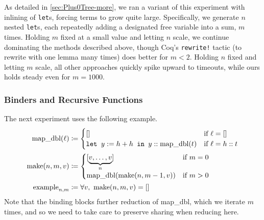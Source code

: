 As detailed in \autoref{sec:Plus0Tree-more}, we ran a variant of this experiment with inlining of \texttt{let}s, forcing terms to grow quite large.
Specifically, we generate $n$ nested \texttt{let}s, each repeatedly adding a designated free variable into a sum, $m$ times.
Holding $m$ fixed at a small value and letting $n$ scale, we continue dominating the methods described above, though Coq's \texttt{rewrite!} tactic (to rewrite with one lemma many times) does better for $m < 2$.
Holding $n$ fixed and letting $m$ scale, all other approaches quickly spike upward to timeouts, while ours holds steady even for $m = 1000$.

\subsubsection{Binders and Recursive Functions} \label{sec:micro:LiftLetsMap}

The next experiment uses the following example.
{\small \allowdisplaybreaks \begin{align*}
  \text{map\_dbl}(\ell) & \defeq \begin{cases} [] & \text{if }\ell = [] \\
      \letin[{y := h + h}{y :: \text{map\_dbl}(t)}] & \text{if }\ell = h::t
      \end{cases} \\
  \text{make}(n, m, v) & \defeq \begin{cases} [\underbrace{v, \ldots, v}_n] & \text{if }m = 0 \\
      \text{map\_dbl}(\text{make}(n, m-1, v)) & \text{if }m > 0
      \end{cases} \\
  \text{example}_{n, m} & \defeq \forall v,\ \text{make}(n, m, v) = []
\end{align*}}%
Note that the  binding blocks further reduction of map\_dbl, which we iterate $m$ times, and so we need to take care to preserve sharing when reducing here.

